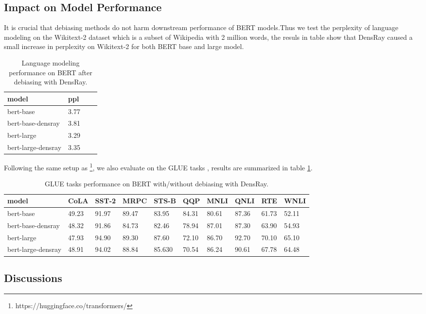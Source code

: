 \subsection{Impact on Model Performance}
It is crucial that debiasing methods do not harm downstream performance of BERT models.Thus we test the perplexity of language modeling on the Wikitext-2 dataset \citep{merity2016pointer} which is a subset of Wikipedia with 2 million words, the resuls in table  show that DensRay caused a small increase in perplexity on Wikitext-2 for both BERT base and large model.
\begin{table}[ht]
\centering
\footnotesize
\begin{tabular}{llll}
\hline
model & ppl\\
\hline
bert-base & 3.77\\
bert-base-densray & 3.81\\
\hline
bert-large & 3.29\\
bert-large-densray & 3.35\\
\hline
\end{tabular}
\caption{
Language modeling performance on BERT after debiasing with DensRay.}
\end{table}

Following the same setup as \citet{wolf2019huggingfaces}\footnote{https://huggingface.co/transformers/}, we also evaluate on the GLUE tasks \citep{wang2018glue}, results are summarized in table \ref{t:glue1}. 
\begin{table}[ht]
\centering
\footnotesize
\begin{tabular}{llllllllll}
\hline
model & CoLA &SST-2&MRPC&STS-B&QQP&MNLI&QNLI&RTE&WNLI\\
\hline
bert-base & 49.23& 91.97&89.47 & 83.95& 84.31& 80.61& 87.36& 61.73& 52.11\\
bert-base-densray & 48.32& 91.86& 84.73& 82.46& 78.94& 87.01& 87.30& 63.90& 54.93\\
\hline
bert-large & 47.93&94.90&89.30&87.60&72.10&86.70&92.70&70.10&65.10\\
bert-large-densray & 48.91&94.02&88.84&85.630&70.54&86.24&90.61&67.78&64.48\\
\hline
\end{tabular}
\caption{\label{t:glue1}
GLUE tasks performance on BERT with/without debiasing with DensRay.}
\end{table}
\subsection{Discussions}
